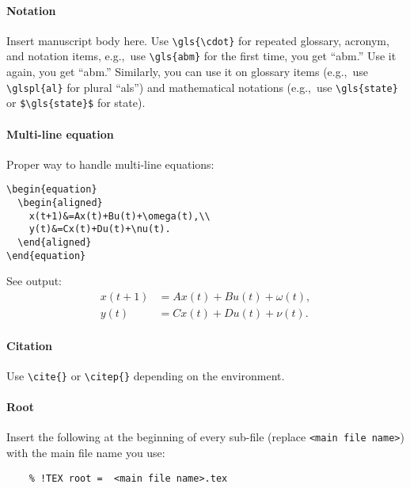 
\paragraph{Notation}
Insert manuscript body here. Use \verb|\gls{\cdot}| for
repeated glossary, acronym, and notation items, 
e.g.,~use \verb|\gls{abm}| for the first time,
you get ``\gls{abm}.'' Use it again, you get ``\gls{abm}.''
Similarly, you can use it on glossary items 
(e.g.,~use \verb|\glspl{al}| for plural ``\glspl{al}'')
and mathematical notations 
(e.g.,~use \verb|\gls{state}| or \verb|$\gls{state}$|
for \gls{state}).

\paragraph{Multi-line equation}
Proper way to handle multi-line equations:
\begin{verbatim}
\begin{equation}
  \begin{aligned}
    x(t+1)&=Ax(t)+Bu(t)+\omega(t),\\
    y(t)&=Cx(t)+Du(t)+\nu(t).
  \end{aligned}
\end{equation}
\end{verbatim}
See output:
\begin{equation}
  \begin{aligned}
    x(t+1)&=Ax(t)+Bu(t)+\omega(t),\\
    y(t)&=Cx(t)+Du(t)+\nu(t).
  \end{aligned}
\end{equation}

\paragraph{Citation} Use \verb|\cite{}| or \verb|\citep{}|
depending on the environment.

\paragraph{Root} Insert the following at the beginning
of every sub-file (replace \verb|<main file name>|)
with the main file name you use:
\begin{verbatim}
	% !TEX root =  <main file name>.tex
\end{verbatim}













